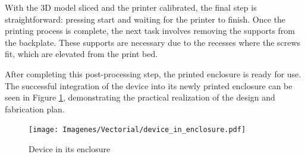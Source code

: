 With the 3D model sliced and the printer calibrated, the final step is straightforward: pressing 
start and waiting for the printer to finish. Once the printing process is complete, the next task 
involves removing the supports from the backplate. These supports are necessary due to the 
recesses where the screws fit, which are elevated from the print bed.

After completing this post-processing step, the printed enclosure is ready for use. The successful 
integration of the device into its newly printed enclosure can be seen in Figure 
\ref{fig:device_in_enclosure}, demonstrating the practical realization of the design and 
fabrication plan.

\begin{figure}[h]
	\centering
	\texttt{[image: Imagenes/Vectorial/device\_in\_enclosure.pdf]}
	\caption{Device in its enclosure}
	\label{fig:device_in_enclosure}
\end{figure}
